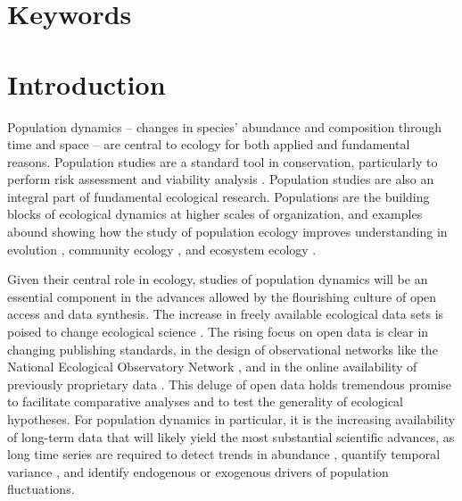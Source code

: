 \documentclass{article}\usepackage[]{graphicx}\usepackage[]{color}
\begin{document}
\section*{Keywords}

\newpage
\section*{Introduction}
\linenumbers

Population dynamics – changes in species’ abundance and composition through time and space – are central to ecology for both applied and fundamental reasons. Population studies are a standard tool in conservation, particularly to perform risk assessment and viability analysis \citep{Morris2002b,Beissinger2002}. Population studies are also an integral part of fundamental ecological research. Populations are the building blocks of ecological dynamics at higher scales of organization, and examples abound showing how the study of population ecology improves understanding in evolution \citep{Metcalf2007}, community ecology \citep{Levine2009}, and ecosystem ecology \citep{Medvigy2009,Fisher2018}.

Given their central role in ecology, studies of population dynamics will be an essential component in the advances allowed by the flourishing culture of open access and data synthesis. The increase in freely available ecological data sets is poised to change ecological science \citep{Laurance2016}. The rising focus on open data is clear in changing publishing standards, in the design of observational networks like the National Ecological Observatory Network \citep{schimel2007neon}, and in the online availability of previously proprietary data \citep{Kratz2003,Bechtold2005}. This deluge of open data holds tremendous promise to facilitate comparative analyses and to test the generality of ecological hypotheses. For population dynamics in particular, it is the increasing availability of long-term data that will likely yield the most substantial scientific advances, as long time series are required to detect trends in abundance \citep{Lindenmayer2012}, quantify temporal variance \citep{Compagnoni2016}, and identify endogenous \citep{Knape2012} or exogenous \citep{Knape2011,Hampton2013} drivers of population fluctuations.
\end{document}
